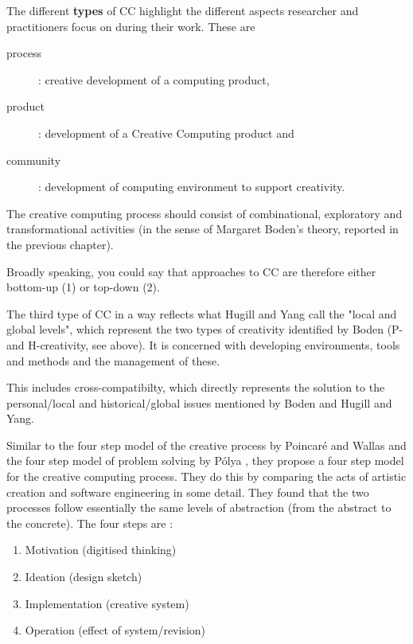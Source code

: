 The different \textbf{types} of CC highlight the different aspects researcher and practitioners focus on during their work. These are

\begin{description}
  \item [process]:  creative development of a computing product,
  \item [product]: development of a Creative Computing product and
  \item [community]: development of computing environment to support creativity.
\end{description}

The creative computing process should consist of combinational, exploratory and transformational activities (in the sense of Margaret Boden’s theory, reported in the previous chapter).

\begin{draft}
  Broadly speaking, you could say that approaches to CC are therefore either bottom-up (1) or top-down (2).
\end{draft}

The third type of CC in a way reflects what Hugill and Yang call the "local and global levels", which represent the two types of creativity identified by Boden (P- and H-creativity, see above). It is concerned with developing environments, tools and methods and the management of these.

\begin{draft}
  This includes cross-compatibilty, which directly represents the solution to the personal/local and historical/global issues mentioned by Boden and Hugill and Yang.
\end{draft}

Similar to the four step model of the creative process by Poincaré and Wallas \citep{Poincare2001, Wallas1926} and the four step model of problem solving by Pólya \citep{Polya1957}, they propose a four step model for the creative computing process. They do this by comparing the acts of artistic creation and software engineering in some detail. They found that the two processes follow essentially the same levels of abstraction (from the abstract to the concrete). The four steps are \citep[p.15]{Polya1957}:

\begin{enumerate}
  \item Motivation (digitised thinking)
  \item Ideation (design sketch)
  \item Implementation (creative system)
  \item Operation (effect of system/revision)
\end{enumerate}

